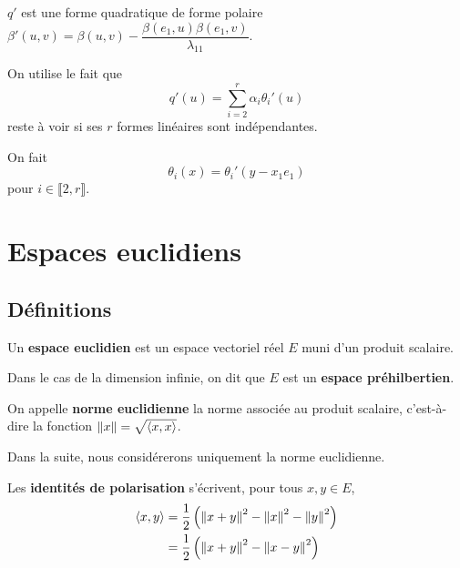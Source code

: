 \documentclass[a4paper,12pt]{article}
\begin{document}
\begin{demonstration}
\begin{enumerate}
\begin{description}
            $q'$ est une forme quadratique de forme polaire $\beta'(u, v) = \beta(u, v) - \dfrac{\beta(e_1, u) \beta(e_1, v)}{\lambda_{11}}$.

            On utilise le fait que
            $$
            q'(u) = \sum_{i=2}^r \alpha_i \theta_i'(u)
            $$
            reste à voir si ses $r$ formes linéaires sont indépendantes.

            On fait
            $$
            \theta_i(x) = \theta_i'(y - x_1 e_1)
            $$
            pour $i \in \llbracket 2, r \rrbracket$.
        \end{description}
    \end{enumerate}
\end{demonstration}

\clearpage

\section{Espaces euclidiens}

\subsection{Définitions}

\begin{definition}
    Un \textbf{espace euclidien} est un espace vectoriel réel $E$ muni d'un produit scalaire.
\end{definition}

\begin{remarque}
    Dans le cas de la dimension infinie, on dit que $E$ est un \textbf{espace préhilbertien}.
\end{remarque}

\begin{definition}
    On appelle \textbf{norme euclidienne} la norme associée au produit scalaire, c'est-à-dire la fonction $\left\lVert x\right\rVert = \sqrt{\langle x, x \rangle}$.
\end{definition}

Dans la suite, nous considérerons uniquement la norme euclidienne.

\begin{definition}
    Les \textbf{identités de polarisation} s'écrivent, pour tous $x, y \in E$,
    \begin{align*}  
        \langle x, y \rangle &= \frac{1}{2} \left( \left\lVert x + y\right\rVert^2 - \left\lVert x\right\rVert^2 - \left\lVert y\right\rVert^2 \right) \\
        &= \frac{1}{2} \left( \left\lVert x + y\right\rVert^2 - \left\lVert x - y\right\rVert^2 \right)
    \end{align*}
\end{definition}
\end{document}
